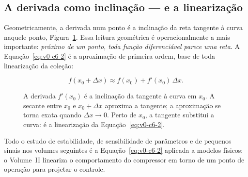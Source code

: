\documentclass[12pt,a4paper]{article}
\numberwithin{equation}{section}
\numberwithin{table}{section}
\numberwithin{figure}{section}
\begin{document}
\subsection{A derivada como inclinação --- e a linearização}

Geometricamente, a derivada num ponto é a inclinação da reta tangente à
curva naquele ponto, Figura~\ref{fig:v0-c6-1}. Essa leitura geométrica é
operacionalmente a mais importante: \emph{próximo de um ponto, toda função
diferenciável parece uma reta}. A Equação~\eqref{eq:v0-c6-2} é a
aproximação de primeira ordem, base de toda linearização da coleção:

\begin{equation}\label{eq:v0-c6-2}
f(x_0 + \Delta x) \approx f(x_0) + f'(x_0)\,\Delta x.
\end{equation}

\begin{figure}[H]
\centering
{}
\caption[A derivada como inclinação da tangente.]{%
A derivada $f'(x_0)$ é a inclinação da tangente à curva em $x_0$. A
secante entre $x_0$ e $x_0+\Delta x$ aproxima a tangente; a aproximação se
torna exata quando $\Delta x \to 0$. Perto de $x_0$, a tangente substitui a
curva: é a linearização da Equação~\eqref{eq:v0-c6-2}.}
\label{fig:v0-c6-1}
\end{figure}

Todo o estudo de estabilidade, de sensibilidade de parâmetros e de
pequenos sinais nos volumes seguintes é a Equação~\eqref{eq:v0-c6-2}
aplicada a modelos físicos: o Volume~II lineariza o comportamento do
compressor em torno de um ponto de operação para projetar o controle.
\end{document}
